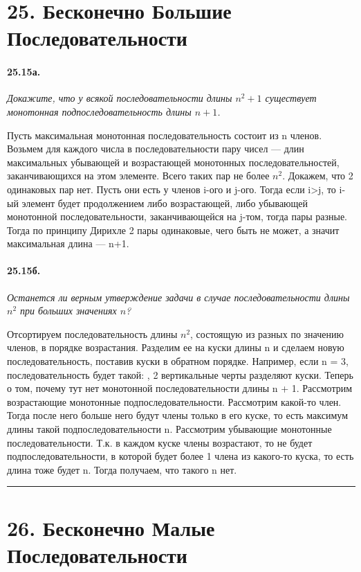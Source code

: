 \documentclass{book}
\begin{document}
\section*{25. Бесконечно Большие Последовательности}

\paragraph{25.15а.}
\textit{Докажите, что у всякой последовательности длины $n^2 + 1$ существует монотонная подпоследовательность длины $n+1$.}

Пусть максимальная монотонная последовательность состоит из n членов. Возьмем для каждого числа в последовательности пару чисел — длин максимальных убывающей и возрастающей монотонных последовательностей, заканчивающихся на этом элементе. Всего таких пар не более $n^2$. Докажем, что 2 одинаковых пар нет. Пусть они есть у членов i-ого и j-ого. Тогда если i>j, то i-ый элемент будет продолжением либо возрастающей, либо убывающей монотонной последовательности, заканчивающейся на j-том, тогда пары разные. Тогда по принципу Дирихле 2 пары одинаковые, чего быть не может, а значит максимальная длина — n+1.

\paragraph{25.15б.}
\textit{Останется ли верным утверждение задачи в случае последовательности длины $n^2$ при больших значениях $n$?}

Отсортируем последовательность длины $n^2$, состоящую из разных по значению членов, в порядке возрастания. Разделим ее на куски длины n и сделаем новую последовательность, поставив куски в обратном порядке. Например, если n = 3, последовательность будет такой: , 2 вертикальные черты разделяют куски. Теперь о том, почему тут нет монотонной последовательности длины n + 1. Рассмотрим возрастающие монотонные подпоследовательности. Рассмотрим какой-то член. Тогда после него больше него будут члены только в его куске, то есть максимум длины такой подпоследовательности n. Рассмотрим убывающие монотонные последовательности. Т.к. в каждом куске члены возрастают, то не будет подпоследовательности, в которой будет более 1 члена из какого-то куска, то есть длина тоже будет n. Тогда получаем, что такого n нет.

\medskip\hrule\medskip
\section*{26. Бесконечно Малые Последовательности}
 
\end{document}
